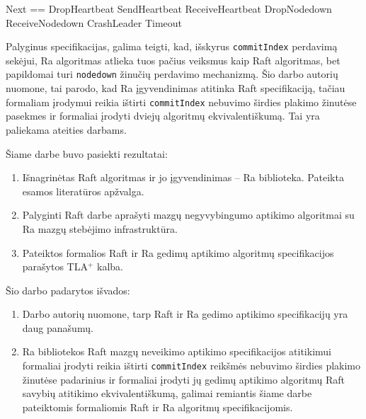 \documentclass{VUMIFPSkursinis}
\begin{document}
\begin{adjustwidth}{2cm}{}

\begin{tla}
Next == \/ DropHeartbeat
        \/ SendHeartbeat
        \/ ReceiveHeartbeat
        \/ DropNodedown
        \/ ReceiveNodedown
        \/ CrashLeader
        \/ Timeout
\end{tla}
\begin{tlatex}
\@pvspace{8.0pt}%
%
%
%
%
%
%
%
\@pvspace{8.0pt}%
\end{tlatex}


\end{adjustwidth}

Palyginus specifikacijas, galima teigti, kad, išskyrus \texttt{commitIndex} perdavimą sekėjui, Ra algoritmas atlieka tuos pačius veiksmus kaip Raft algoritmas, bet papildomai turi \texttt{nodedown} žinučių perdavimo mechanizmą. Šio darbo autorių nuomone, tai parodo, kad Ra įgyvendinimas atitinka Raft specifikaciją, tačiau formaliam įrodymui reikia ištirti \texttt{commitIndex} nebuvimo širdies plakimo žinutėse pasekmes ir formaliai įrodyti dviejų algoritmų ekvivalentiškumą. Tai yra paliekama ateities darbams.


Šiame darbe buvo pasiekti rezultatai:
\begin{enumerate}
\item Išnagrinėtas Raft algoritmas ir jo įgyvendinimas -- Ra biblioteka. Pateikta esamos literatūros apžvalga.
\item Palyginti Raft darbe aprašyti mazgų negyvybingumo aptikimo algoritmai su Ra mazgų stebėjimo infrastruktūra.
\item Pateiktos formalios Raft ir Ra gedimų aptikimo algoritmų specifikacijos parašytos TLA$^+$ kalba.
\end{enumerate}

Šio darbo padarytos išvados:
\begin{enumerate}
\item Darbo autorių nuomone, tarp Raft ir Ra gedimo aptikimo specifikacijų yra daug panašumų.
\item Ra bibliotekos Raft mazgų neveikimo aptikimo specifikacijos atitikimui formaliai įrodyti reikia ištirti \texttt{commitIndex} reikšmės nebuvimo širdies plakimo žinutėse padarinius ir formaliai įrodyti jų gedimų aptikimo algoritmų Raft savybių atitikimo ekvivalentiškumą, galimai remiantis šiame darbe pateiktomis formaliomis Raft ir Ra algoritmų specifikacijomis.
\end{enumerate}
\end{document}
